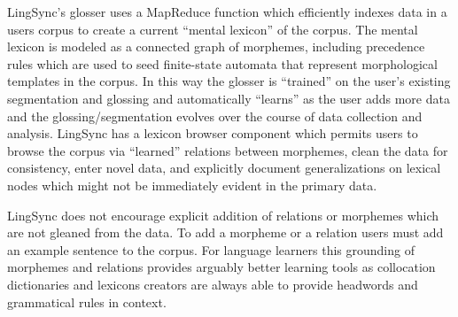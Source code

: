 \documentclass[11pt]{article}
\newcommand{\smalltodo}[2][]
    {\todo[caption={#2}, #1]
    {\tiny#2\normalsize}}
\begin{document}
LingSync's glosser  uses a MapReduce function which efficiently indexes data in
a users corpus to create a current ``mental lexicon'' of the corpus.  The
mental lexicon is modeled as a connected graph of morphemes, including
precedence rules which are used to seed finite-state automata  \cite{Cook:2009}
that represent morphological templates in the corpus. 
In this way the glosser is ``trained'' on the user's existing segmentation and
glossing and automatically ``learns'' as the user adds more data and the
glossing/segmentation evolves over the course of data collection and analysis. 
LingSync has a lexicon browser component which permits users to browse the
corpus via ``learned''  relations between morphemes, clean the data for
consistency, enter novel data, and explicitly document generalizations on
lexical nodes which might not be immediately evident in the primary data. 

LingSync does not encourage explicit addition of relations or morphemes which
are not gleaned from the data.  
To add a morpheme or a relation users must add an example sentence to the corpus. 
For language learners this grounding of morphemes and relations provides arguably better learning
tools as collocation dictionaries and lexicons creators are always able to
provide headwords and grammatical rules in context.%
%
\end{document}
